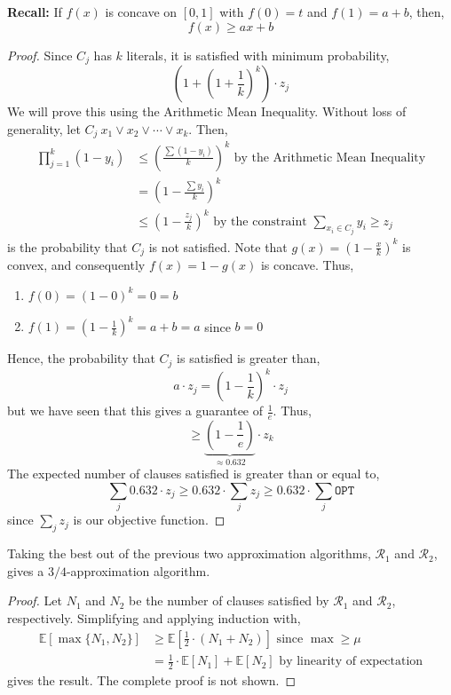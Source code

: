 \begin{marginfigure}
	\textbf{Recall: } If $f(x)$ is concave on $[0,1]$ with $f(0) = t$ and $f(1) = a + b$, then, \[f(x) \geq ax + b\]
\end{marginfigure}

\begin{proof}
	Since $C_j$ has $k$ literals, it is satisfied with minimum probability,
	 \[\left(1 + \left(1 + \frac{1}{k}\right)^k\right) \cdot z_j\]
	 \noindent We will prove this using the Arithmetic Mean Inequality. Without loss of generality, let $C_j \ x_1 \lor x_2 \lor \cdots \lor x_k$. Then,
	\begin{align*}
		\prod_{j=1}^k (1 - y_i) &\leq \left(\frac{\sum (1-y_i)}{k} \right)^k \text{ by the Arithmetic Mean Inequality}\\
								&= \left(1 - \frac{\sum y_i}{k}\right)^k \\
								&\leq \left(1 - \frac{z_j}{k}\right)^k \text{ by the constraint $\sum_{x_i \in C_j} y_i \geq z_j$}
	\end{align*}
	\noindent is the probability that $C_j$ is not satisfied. Note that $g(x) = \left(1 - \frac{x}{k}\right)^k$ is convex, and consequently $f(x) = 1 - g(x)$ is concave. Thus,
	\begin{enumerate}
		\item $f(0) = (1 - 0)^k = 0 = b$
		\item $f(1) = (1 - \frac{1}{k})^k = a + b = a$ since $b = 0$
	\end{enumerate}
	\noindent Hence, the probability that $C_j$ is satisfied is greater than,
	\[a \cdot z_j = \left(1 - \frac{1}{k}\right)^k \cdot z_j\]
	\noindent but we have seen that this gives a guarantee of $\frac{1}{e}$. Thus,
	\[\geq \underbrace{\left(1 - \frac{1}{e}\right)}_{\approx 0.632} \cdot z_k\]
	\noindent The expected number of clauses satisfied is greater than or equal to,
	\[\sum_j 0.632 \cdot z_j \geq 0.632 \cdot \sum_j z_j \geq 0.632 \cdot \sum_j \texttt{OPT}\]
	\noindent since $\sum_j z_j$ is our objective function.
\end{proof}

\begin{thm}
	Taking the best out of the previous two approximation algorithms, $\mathcal{R}_1$ and $\mathcal{R}_2$, gives a $3/4$-approximation algorithm.
\end{thm}

\begin{proof}
	Let $N_1$ and $N_2$ be the number of clauses satisfied by $\mathcal{R}_1$ and $\mathcal{R}_2$, respectively. Simplifying and applying induction with,
	\begin{align*}
		\mathbb{E}[\max \{N_1, N_2\}] &\geq \mathbb{E}\left[\frac{1}{2} \cdot (N_1 + N_2)\right] \text{ since $\max \geq \mu$}\\
								     &= \frac{1}{2} \cdot \mathbb{E}[N_1] + \mathbb{E}[N_2] \text{ by linearity of expectation}
	\end{align*}
	\noindent gives the result. The complete proof is not shown.
\end{proof}

